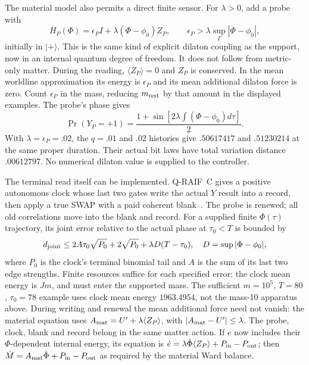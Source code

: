 \documentclass[12pt,a4paper]{article}
\begin{document}
The material model also permits a direct finite sensor. For $\lambda>0$, add a probe with
\begin{equation}\label{eq:material-probe}
 H_P(\Phi)=\epsilon_P I+\lambda(\Phi-\phi_0)Z_P,
 \qquad \epsilon_P>\lambda\sup_\Gamma|\Phi-\phi_0|,
\end{equation}
initially in $|+\rangle$. This is the same kind of explicit dilaton
coupling as the support, now in an internal quantum degree of freedom.
It does not follow from metric-only matter.
During the reading, $\langle Z_P\rangle=0$ and $Z_P$ is conserved.
In the mean worldline approximation its energy is $\epsilon_P$ and its
mean additional dilaton force is zero. Count $\epsilon_P$ in the mass,
reducing $m_{\rm rest}$ by that amount in the displayed examples.
The probe's phase gives
\begin{equation}\label{eq:material-probe-record}
 \Pr(Y_P=+1)=\frac{1+\sin[2\lambda\int(\Phi-\phi_0)d\tau]}2.
\end{equation}
With $\lambda=\epsilon_P=.02$, the $q=.01$ and $.02$ histories give
$.50617417$ and $.51230214$ at the same proper duration.
Their actual bit laws have total variation distance $.00612797$.
No numerical dilaton value is supplied to the controller.

The terminal read itself can be implemented. Q-RAIF~C gives a positive
autonomous clock whose last two gates write the actual $Y$ result into
a record, then apply a true SWAP with a paid coherent blank~\cite{QRC}.
The probe is renewed; all old correlations move into the blank and
record. For a supplied finite $\Phi(\tau)$ trajectory, its joint error
relative to the actual phase at $\tau_0<T$ is bounded by
\begin{equation}\label{eq:material-terminal-read}
 d_{\rm joint}\le2A\tau_0\sqrt{P_0}+2\sqrt{P_0}
                    +\lambda D(T-\tau_0),\quad
 D=\sup|\Phi-\phi_0|,
\end{equation}
where $P_0$ is the clock's terminal binomial tail and $A$ is the sum
of its last two edge strengths. Finite resources suffice for each
specified error; the clock mean energy is $Jm$, and must enter the
supported mass. The sufficient $m=10^5$, $T=80$, $\tau_0=78$ example
uses clock mean energy $1963.4954$, not the mass-10 apparatus above.
During writing and renewal the mean additional force need not vanish:
the material equation uses $A_{\rm mat}=U'+\lambda\langle Z_P\rangle$,
with $|A_{\rm mat}-U'|\le\lambda$. The probe, clock, blank and record
belong in the same matter action. If $e$ now includes their
$\Phi$-dependent internal energy, its equation is
$\dot e=\lambda\dot\Phi\langle Z_P\rangle+P_{\rm in}-P_{\rm out}$;
then $\dot M=A_{\rm mat}\dot\Phi+P_{\rm in}-P_{\rm out}$ as required
by the material Ward balance.
\end{document}
